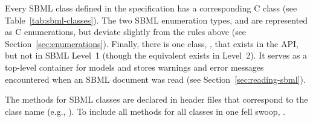 \documentclass{sbmlmanual}
\begin{document}
Every SBML class defined in the specification has a corresponding C class
(see Table~\vref{tab:sbml-classes}).  The two SBML enumeration types,
 and  are represented as C enumerations,
but deviate slightly from the rules above (see
Section~\ref{sec:enumerations}).  Finally, there is one class,
, that exists in the \libsbml{} API, but not in SBML
Level~1 (though the equivalent exists in Level~2).  It serves as a
top-level container for models and stores warnings and error messages
encountered when an SBML document was read (see
Section~\ref{sec:reading-sbml}).

The methods for SBML classes are declared in header files that correspond
to the class name (e.g., ).  To include all methods for all
classes in one fell swoop, .
\end{document}
